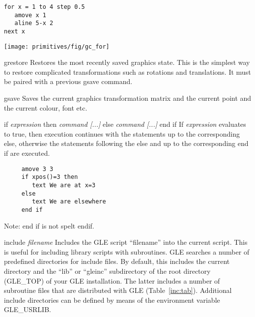 \begin{commanddescription}
\begin{minipage}[c]{8cm}
\begin{Verbatim}
for x = 1 to 4 step 0.5
   amove x 1
   aline 5-x 2
next x
\end{Verbatim}
\end{minipage}
\hfill
\begin{minipage}[c]{7cm}
\mbox{\texttt{[image: primitives/fig/gc\_for]}}
\end{minipage}

\item[{\sf grestore}]
 Restores the most recently saved graphics state.  This is the simplest way to
restore complicated transformations such as rotations and translations.  It
must be paired with a previous {\sf gsave} command.

\item[{\sf gsave}]
 Saves the current graphics transformation matrix and the current point
and the current colour, font etc.

\item[{\sf if {\it expression} then {\it command [...]} else {\it command [...]} end if}]
If {\it expression} evaluates to true, then execution continues with the
statements up to the corresponding {\sf else}, otherwise the statements
following the {\sf else} and up to the corresponding {\sf end if} are executed.

\preglecode{}
\begin{Verbatim}
     amove 3 3
     if xpos()=3 then
        text We are at x=3
     else
        text We are elsewhere
     end if
\end{Verbatim}
\postglecode{}

Note: {\sf end if} is not spelt {\sf endif}.

\item[{\sf include {\it filename}}]\label{incl:cmnd}
 Includes the GLE script ``filename'' into the current script. This is useful for including library scripts with subroutines. GLE searches a number of predefined directories for include files. By default, this includes the current directory and the ``lib'' or ``gleinc'' subdirectory of the root directory (GLE\_TOP) of your GLE installation. The latter includes a number of subroutine files that are distributed with GLE (Table~\ref{inc:tab}). Additional include directories can be defined by means of the environment variable GLE\_USRLIB.


\end{commanddescription}
